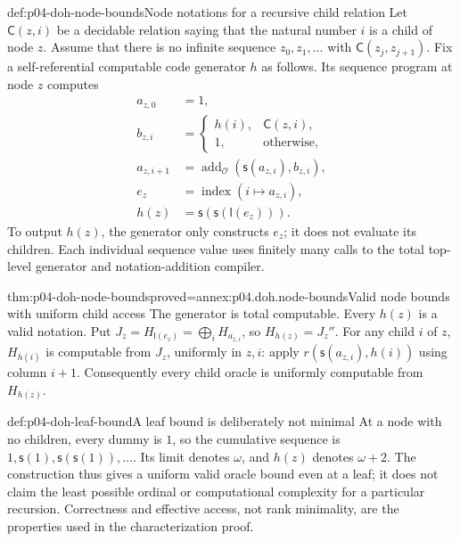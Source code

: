 \begin{hbdefinition}{def:p04-doh-node-bounds}{Node notations for a recursive child relation}
Let \(\mathsf C(z,i)\) be a decidable relation saying that the natural
number \(i\) is a child of node \(z\). Assume that there is no infinite
sequence \(z_0,z_1,\ldots\) with \(\mathsf C(z_j,z_{j+1})\).
Fix a self-referential computable code generator \(h\) as follows. Its
sequence program at node \(z\) computes
\[
\begin{aligned}
 a_{z,0}&=1,\\
 b_{z,i}&=\begin{cases}h(i),&\mathsf C(z,i),\\1,&\text{otherwise},\end{cases}\\
 a_{z,i+1}&=\operatorname{add}_{\mathcal O}
                  (\mathsf s(a_{z,i}),b_{z,i}),\\
 e_z&=\operatorname{index}(i\mapsto a_{z,i}),\\
 h(z)&=\mathsf s(\mathsf s(\mathsf l(e_z))).
\end{aligned}
\]
To output \(h(z)\), the generator only constructs \(e_z\); it does not
evaluate its children. Each individual sequence value uses finitely many
calls to the total top-level generator and notation-addition compiler.
\end{hbdefinition}

\begin{hblemma}{thm:p04-doh-node-bounds}{proved=annex:p04.doh.node-bounds}{Valid node bounds with uniform child access}
The generator is total computable. Every \(h(z)\) is a valid notation.
Put \(J_z=H_{\mathsf l(e_z)}=\bigoplus_i H_{a_{z,i}}\), so
\(H_{h(z)}=J_z''\). For any child \(i\) of \(z\),
\(H_{h(i)}\) is computable from \(J_z\), uniformly in \(z,i\): apply
\(r(\mathsf s(a_{z,i}),h(i))\) using column \(i+1\).
Consequently every child oracle is uniformly computable from \(H_{h(z)}\).
\end{hblemma}

\begin{hbexample}{def:p04-doh-leaf-bound}{A leaf bound is deliberately not minimal}
At a node with no children, every dummy is \(1\), so the cumulative
sequence is \(1,\mathsf s(1),\mathsf s(\mathsf s(1)),\ldots\).
Its limit denotes \(\omega\), and \(h(z)\) denotes \(\omega+2\).
The construction thus gives a uniform valid oracle bound even at a leaf;
it does not claim the least possible ordinal or computational complexity
for a particular recursion. Correctness and effective access, not rank
minimality, are the properties used in the characterization proof.
\end{hbexample}

